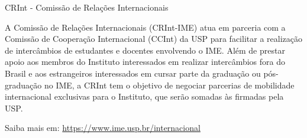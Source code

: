 \begin{secao}{CRInt - Comissão de Relações Internacionais}

A Comissão de Relações Internacionais (CRInt-IME) atua em parceria com a Comissão
de Cooperação Internacional (CCInt) da USP para facilitar a realização de
intercâmbios de estudantes e docentes envolvendo o IME. Além de prestar apoio aos
membros do Instituto interessados em realizar intercâmbios fora do Brasil e aos
estrangeiros interessados em cursar parte da graduação ou pós-graduação no IME,
a CRInt tem o objetivo de negociar parcerias de mobilidade internacional exclusivas
para o Instituto, que serão somadas às firmadas pela USP.

Saiba mais em: \url{https://www.ime.usp.br/internacional}
\end{secao}
